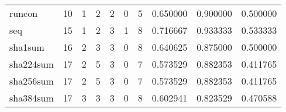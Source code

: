 \begin{longtable}{lrrrrrrrrr}
runcon    &                                      10 &                                                  1 &                                                  2 &                                                  2 &                                                  0 &                                                  5 &                                           0.650000 &                               0.900000 &                             0.500000 \\
seq       &                                      15 &                                                  1 &                                                  2 &                                                  3 &                                                  1 &                                                  8 &                                           0.716667 &                               0.933333 &                             0.533333 \\
sha1sum   &                                      16 &                                                  2 &                                                  3 &                                                  3 &                                                  0 &                                                  8 &                                           0.640625 &                               0.875000 &                             0.500000 \\
sha224sum &                                      17 &                                                  2 &                                                  5 &                                                  3 &                                                  0 &                                                  7 &                                           0.573529 &                               0.882353 &                             0.411765 \\
sha256sum &                                      17 &                                                  2 &                                                  5 &                                                  3 &                                                  0 &                                                  7 &                                           0.573529 &                               0.882353 &                             0.411765 \\
sha384sum &                                      17 &                                                  3 &                                                  3 &                                                  3 &                                                  0 &                                                  8 &                                           0.602941 &                               0.823529 &                             0.470588 \\

\end{longtable}
